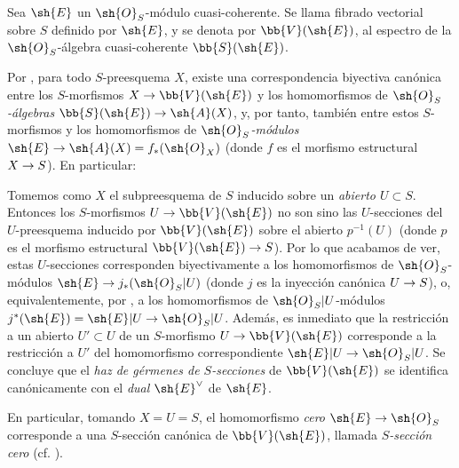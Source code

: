 \documentclass[oneside,10pt]{amsart}
\makeatletter
\providecommand{\dual}{}\renewcommand{\dual}[1]{{#1}^{\vee}}
\newcommand{\ega@arrow}[2]{\mathchoice{#1}{#2}{#2}{#2}}
\renewcommand{\to}{\ega@arrow{\longrightarrow}{\rightarrow}}
\newcommand{\oldpage}[2][]{\marginnote{\normalfont\footnotesize\textbf{#1}~|~#2}\ignorespaces}
\let\EGAOriginalLabel\label
\renewcommand{\label}[1]{\phantomsection\EGAOriginalLabel{#1}}
\makeatother
\begin{document}
\begin{definition}[1.7.8]
\label{II.1.7.8}
Sea $\sh{E}$ un $\sh{O}_S$-módulo cuasi-coherente.
Se llama fibrado vectorial sobre $S$ definido por $\sh{E}$, y se denota por $\bb{V}(\sh{E})$, al espectro  de la $\sh{O}_S$-álgebra cuasi-coherente $\bb{S}(\sh{E})$.
\end{definition}

Por , para todo $S$-preesquema $X$, existe una correspondencia biyectiva canónica entre los $S$-morfismos $X\to\bb{V}(\sh{E})$ y los homomorfismos de \emph{$\sh{O}_S$-álgebras $\bb{S}(\sh{E})\to\sh{A}(X)$}, y, por tanto, también entre estos $S$-morfismos y los homomorfismos de \emph{$\sh{O}_S$-módulos $\sh{E}\to\sh{A}(X)=f_*(\sh{O}_X)$} (donde $f$ es el morfismo estructural $X\to S$).
En particular:

\begin{env}[1.7.9]
\label{II.1.7.9}
Tomemos como $X$ el subpreesquema de $S$ inducido sobre un \emph{abierto $U\subset S$}.
Entonces los $S$-morfismos $U\to\bb{V}(\sh{E})$ no son sino las $U$-secciones  del $U$-preesquema inducido por $\bb{V}(\sh{E})$ sobre el abierto $p^{-1}(U)$ (donde $p$ es el morfismo estructural $\bb{V}(\sh{E})\to S$).
Por lo que acabamos de ver, estas $U$-secciones corresponden biyectivamente a los homomorfismos de $\sh{O}_S$-módulos $\sh{E}\to j_*(\sh{O}_S|U)$ (donde $j$ es la inyección canónica $U\to S$), o,
\oldpage[II]{17}
equivalentemente, por , a los homomorfismos de $\sh{O}_S|U$-módulos $j^*(\sh{E})=\sh{E}|U\to\sh{O}_S|U$.
Además, es inmediato que la restricción a un abierto $U'\subset U$ de un $S$-morfismo $U\to\bb{V}(\sh{E})$ corresponde a la restricción a $U'$ del homomorfismo correspondiente $\sh{E}|U\to\sh{O}_S|U$.
Se concluye que el \emph{haz de gérmenes de $S$-secciones} de $\bb{V}(\sh{E})$ se identifica canónicamente con el \emph{dual $\dual{\sh{E}}$} de $\sh{E}$.

En particular, tomando $X=U=S$, el homomorfismo \emph{cero} $\sh{E}\to\sh{O}_S$ corresponde a una $S$-sección canónica de $\bb{V}(\sh{E})$, llamada \emph{$S$-sección cero} (cf. ).
\end{env}
\end{document}
